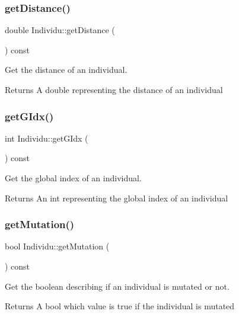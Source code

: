 \subsubsection{\texorpdfstring{get\+Distance()}{getDistance()}}
{\footnotesize\ttfamily double Individu\+::get\+Distance (\begin{DoxyParamCaption}{ }\end{DoxyParamCaption}) const}



Get the distance of an individual. 

\begin{DoxyReturn}{Returns}
A double representing the distance of an individual 
\end{DoxyReturn}
\mbox{\label{class_individu_acb09f4a7219773933b9261be41e6e0e7}} 
\subsubsection{\texorpdfstring{get\+G\+Idx()}{getGIdx()}}
{\footnotesize\ttfamily int Individu\+::get\+G\+Idx (\begin{DoxyParamCaption}{ }\end{DoxyParamCaption}) const}



Get the global index of an individual. 

\begin{DoxyReturn}{Returns}
An int representing the global index of an individual 
\end{DoxyReturn}
\mbox{\label{class_individu_afa42bb4d0c582475f4f4a0c506e7bc15}} 
\subsubsection{\texorpdfstring{get\+Mutation()}{getMutation()}}
{\footnotesize\ttfamily bool Individu\+::get\+Mutation (\begin{DoxyParamCaption}{ }\end{DoxyParamCaption}) const}



Get the boolean describing if an individual is mutated or not. 

\begin{DoxyReturn}{Returns}
A bool which value is true if the individual is mutated 
\end{DoxyReturn}
\mbox{\label{class_individu_a64b1dae7754d35a424866f2a6fedac6e}} 
